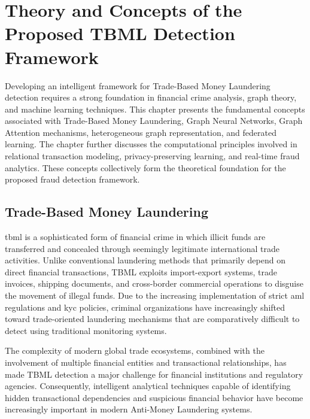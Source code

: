 \chapter{Theory and Concepts of the Proposed TBML Detection Framework}

Developing an intelligent framework for Trade-Based Money Laundering detection requires a strong foundation in financial crime analysis, graph theory, and machine learning techniques. This chapter presents the fundamental concepts associated with Trade-Based Money Laundering, Graph Neural Networks, Graph Attention mechanisms, heterogeneous graph representation, and federated learning. The chapter further discusses the computational principles involved in relational transaction modeling, privacy-preserving learning, and real-time fraud analytics. These concepts collectively form the theoretical foundation for the proposed fraud detection framework.

\section[Trade-Based Money Laundering ]{\textbf{Trade-Based Money Laundering }}

\gls{tbml} is a sophisticated form of financial crime in which illicit funds are transferred and concealed through seemingly legitimate international trade activities. Unlike conventional laundering methods that primarily depend on direct financial transactions, TBML exploits import-export systems, trade invoices, shipping documents, and cross-border commercial operations to disguise the movement of illegal funds. Due to the increasing implementation of strict \gls{aml} regulations and \gls{kyc} policies, criminal organizations have increasingly shifted toward trade-oriented laundering mechanisms that are comparatively difficult to detect using traditional monitoring systems.

The complexity of modern global trade ecosystems, combined with the involvement of multiple financial entities and transactional relationships, has made TBML detection a major challenge for financial institutions and regulatory agencies. Consequently, intelligent analytical techniques capable of identifying hidden transactional dependencies and suspicious financial behavior have become increasingly important in modern Anti-Money Laundering systems.


